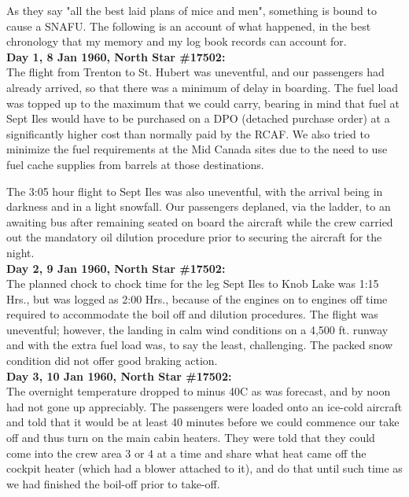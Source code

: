As they say "all the best laid plans of mice and men", something is
bound to cause a SNAFU. The following is an account of what happened,
in the best chronology that my memory and my log book records can
account for.\\

\noindent\textbf{Day 1, 8 Jan 1960, North Star \#17502:}\\

The flight from Trenton to St. Hubert was uneventful, and our
passengers had already arrived, so that there was a minimum of delay in
boarding. The fuel load was topped up to the maximum that we could
carry, bearing in mind that fuel at Sept Iles would have to be
purchased on a DPO (detached  purchase order) at a significantly higher
cost than normally paid by the RCAF. We also tried to minimize the fuel
requirements at the Mid Canada sites due to the need to use fuel cache
supplies from barrels at those destinations.

The 3:05 hour flight to Sept Iles was also uneventful, with the arrival
being in darkness and in a light snowfall. Our passengers deplaned, via
the ladder, to an awaiting bus after remaining seated on board the
aircraft while the crew carried out the mandatory oil dilution
procedure prior to securing the aircraft for the night.\\

\noindent\textbf{Day 2, 9 Jan 1960, North Star \#17502:}\\

The planned chock to chock time for the leg Sept Iles to Knob Lake was
1:15 Hrs., but was logged as 2:00 Hrs., because of the engines on to
engines off time required to accommodate the boil off and dilution
procedures. The flight was uneventful; however, the landing in calm
wind conditions on a 4,500 ft. runway and with the extra fuel load was,
to say the least, challenging. The packed snow condition did not offer
good braking action.\\

\noindent\textbf{Day 3, 10 Jan 1960, North Star \#17502:}\\

The overnight temperature dropped to minus 40C as was forecast, and by
noon had not gone up appreciably. The passengers were loaded onto an
ice-cold aircraft and told that it would be at least 40 minutes before
we could commence our take off and thus turn on the main cabin heaters.
They were told that they could come into the crew area 3 or 4 at a time
and share what heat came off the cockpit heater (which had a blower
attached to it), and do that until such time as we had finished the
boil-off prior to take-off.

